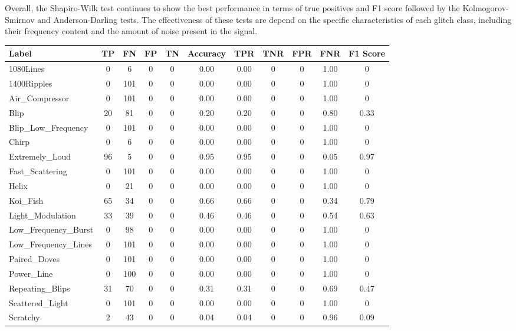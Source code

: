 \documentclass[12pt]{article}
\begin{document}
\noindent Overall, the Shapiro-Wilk test continues to show the best performance in terms of true positives and F1 score followed by the Kolmogorov-Smirnov and Anderson-Darling tests. The effectiveness of these tests are depend on the specific characteristics of each glitch class, including their frequency content and the amount of noise present in the signal.

\begin{table}[H]
  \begin{tabular}{lcccccccccc}
  \toprule
  Label & TP & FN & FP & TN & Accuracy & TPR & TNR & FPR & FNR & F1 Score \\
  \midrule
  1080Lines & 0 & 6 & 0 & 0 & 0.00 & 0.00 & 0 & 0 & 1.00 & 0 \\
  1400Ripples & 0 & 101 & 0 & 0 & 0.00 & 0.00 & 0 & 0 & 1.00 & 0 \\
  Air\_Compressor & 0 & 101 & 0 & 0 & 0.00 & 0.00 & 0 & 0 & 1.00 & 0 \\
  Blip & 20 & 81 & 0 & 0 & 0.20 & 0.20 & 0 & 0 & 0.80 & 0.33 \\
  Blip\_Low\_Frequency & 0 & 101 & 0 & 0 & 0.00 & 0.00 & 0 & 0 & 1.00 & 0 \\
  Chirp & 0 & 6 & 0 & 0 & 0.00 & 0.00 & 0 & 0 & 1.00 & 0 \\
  Extremely\_Loud & 96 & 5 & 0 & 0 & 0.95 & 0.95 & 0 & 0 & 0.05 & 0.97 \\
  Fast\_Scattering & 0 & 101 & 0 & 0 & 0.00 & 0.00 & 0 & 0 & 1.00 & 0 \\
  Helix & 0 & 21 & 0 & 0 & 0.00 & 0.00 & 0 & 0 & 1.00 & 0 \\
  Koi\_Fish & 65 & 34 & 0 & 0 & 0.66 & 0.66 & 0 & 0 & 0.34 & 0.79 \\
  Light\_Modulation & 33 & 39 & 0 & 0 & 0.46 & 0.46 & 0 & 0 & 0.54 & 0.63 \\
  Low\_Frequency\_Burst & 0 & 98 & 0 & 0 & 0.00 & 0.00 & 0 & 0 & 1.00 & 0 \\
  Low\_Frequency\_Lines & 0 & 101 & 0 & 0 & 0.00 & 0.00 & 0 & 0 & 1.00 & 0 \\
  Paired\_Doves & 0 & 101 & 0 & 0 & 0.00 & 0.00 & 0 & 0 & 1.00 & 0 \\
  Power\_Line & 0 & 100 & 0 & 0 & 0.00 & 0.00 & 0 & 0 & 1.00 & 0 \\
  Repeating\_Blips & 31 & 70 & 0 & 0 & 0.31 & 0.31 & 0 & 0 & 0.69 & 0.47 \\
  Scattered\_Light & 0 & 101 & 0 & 0 & 0.00 & 0.00 & 0 & 0 & 1.00 & 0 \\
  Scratchy & 2 & 43 & 0 & 0 & 0.04 & 0.04 & 0 & 0 & 0.96 & 0.09 \\

\end{tabular}
\end{table}
\end{document}
